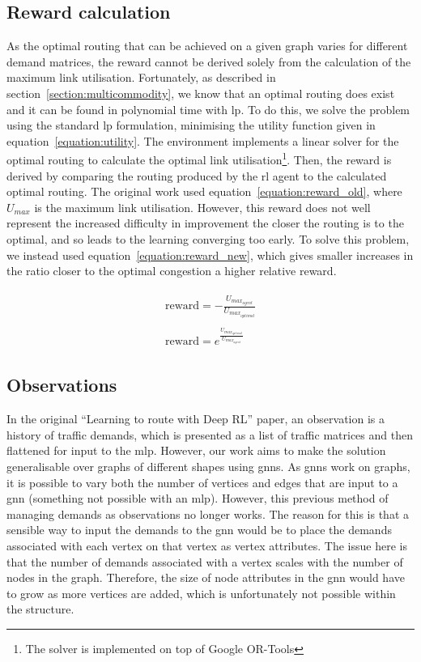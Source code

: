 \subsection{Reward calculation}
As the optimal routing that can be achieved on a given graph varies for different demand matrices, the reward cannot be derived solely from the calculation of the maximum link utilisation. Fortunately, as described in section~\ref{section:multicommodity}, we know that an optimal routing does exist and it can be found in polynomial time with \ac{lp}. To do this, we solve the problem using the standard \ac{lp} formulation, minimising the utility function given in equation~\ref{equation:utility}. The environment implements a linear solver for the optimal routing to calculate the optimal link utilisation\footnote{The solver is implemented on top of Google OR-Tools\cite{ortools}}. Then, the reward is derived by comparing the routing produced by the \ac{rl} agent to the calculated optimal routing. The original work used equation~\ref{equation:reward_old}, where $U_{max}$ is the maximum link utilisation. However, this reward does not well represent the increased difficulty in improvement the closer the routing is to the optimal, and so leads to the learning converging too early. To solve this problem, we instead used equation~\ref{equation:reward_new}, which gives smaller increases in the ratio closer to the optimal congestion a higher relative reward.

\begin{align}
  \begin{split}
    \label{equation:reward_old}
    \mathrm{reward} = -\frac{U_{max_{agent}}}{U_{max_{optimal}}}
  \end{split}\\
  \begin{split}
    \label{equation:reward_new}
    \mathrm{reward} = e^{\frac{U_{max_{optimal}}}{U_{max_{agent}}}}
  \end{split}
\end{align}


\subsection{Observations}
In the original ``Learning to route with Deep RL'' paper, an observation is a history of traffic demands, which is presented as a list of traffic matrices and then flattened for input to the \ac{mlp}. However, our work aims to make the solution generalisable over graphs of different shapes using \acp{gnn}. As \acp{gnn} work on graphs, it is possible to vary both the number of vertices and edges that are input to a \ac{gnn} (something not possible with an \ac{mlp}). However, this previous method of managing demands as observations no longer works. The reason for this is that a sensible way to input the demands to the \ac{gnn} would be to place the demands associated with each vertex on that vertex as vertex attributes. The issue here is that the number of demands associated with a vertex scales with the number of nodes in the graph. Therefore, the size of node attributes in the \ac{gnn} would have to grow as more vertices are added, which is unfortunately not possible within the structure.

